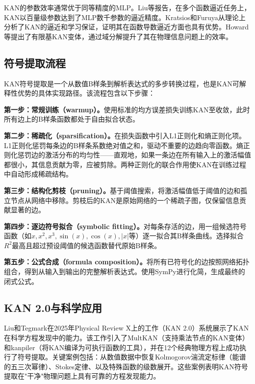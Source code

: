 KAN的参数效率通常优于同等精度的MLP。Liu等\cite{liu2025kan}报告，在多个函数逼近任务上，KAN以百量级参数达到了MLP数千参数的逼近精度。Kratsios和Furuya\cite{kratsios2024kan}从理论上分析了KAN的逼近和学习保证，证明其在函数导数逼近方面也具有优势。Howard等\cite{howard2024finite}提出了有限基KAN变体，通过域分解提升了其在物理信息问题上的效率。

\subsection{符号提取流程}

KAN符号提取是一个从数值B样条到解析表达式的多步转换过程，也是KAN可解释性优势的具体实现路径\cite{liu2025kan,liu2025kan2}。该流程包含以下步骤：

\textbf{第一步：常规训练（warmup）。}使用标准的均方误差损失训练KAN至收敛，此时所有边上的B样条函数都处于自由拟合状态。

\textbf{第二步：稀疏化（sparsification）。}在损失函数中引入L1正则化和熵正则化项。L1正则化惩罚每条边的B样条系数绝对值之和，驱动不重要的边趋向零函数。熵正则化惩罚边的激活分布的均匀性——直观地，如果一条边在所有输入上的激活幅值都很小，其信息贡献为零，应被剪除。两种正则化的联合作用使KAN在训练过程中自动形成稀疏结构。

\textbf{第三步：结构化剪枝（pruning）。}基于阈值搜索，将激活幅值低于阈值的边和孤立节点从网络中移除。剪枝后的KAN是原始网络的一个稀疏子图，仅保留信息贡献显著的边。

\textbf{第四步：逐边符号拟合（symbolic fitting）。}对每条存活的边，用一组候选符号函数（如$x, x^2, x^3, \sin(x), \cos(x), |x|$等）逐一拟合其B样条曲线。选择拟合$R^2$最高且超过预设阈值的候选函数替代原始B样条。

\textbf{第五步：公式合成（formula composition）。}将所有已符号化的边按照网络拓扑组合，得到从输入到输出的完整解析表达式。使用SymPy进行化简，生成最终的闭式公式。

\subsection{KAN 2.0与科学应用}

Liu和Tegmark\cite{liu2025kan2}在2025年Physical Review X上的工作（KAN 2.0）系统展示了KAN在科学方程发现中的能力。该工作引入了MultKAN（支持乘法节点的KAN变体）和kanpiler（将KAN编译为可执行函数的工具），并在12个经典物理方程上成功执行了符号提取。关键案例包括：从数值数据中恢复Kolmogorov湍流定标律（能谱的五三次幂律）、Stokes定律、以及特殊函数的级数展开。这些案例表明KAN符号提取在"干净"物理问题上具有可靠的方程发现能力。

